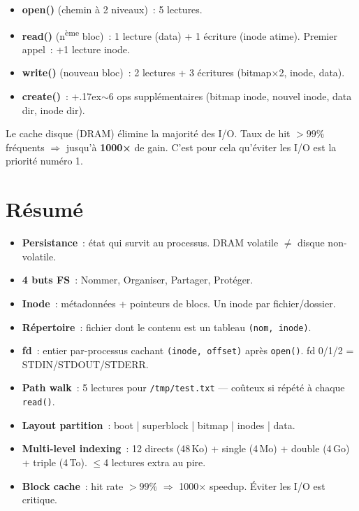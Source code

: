 \documentclass[11pt,a4paper,openany]{book}
\begin{document}
\begin{keybox}[title={Nombre d'opérations disque}]
\begin{itemize}
  \item \textbf{open()} (chemin à 2 niveaux)~: 5 lectures.
  \item \textbf{read()} (n\textsuperscript{ème} bloc)~: 1 lecture (data) + 1 écriture (inode atime). Premier appel~: +1 lecture inode.
  \item \textbf{write()} (nouveau bloc)~: 2 lectures + 3 écritures (bitmap×2, inode, data).
  \item \textbf{create()}~: +{\raise.17ex\hbox{$\scriptstyle\sim$}}6 ops supplémentaires (bitmap inode, nouvel inode, data dir, inode dir).
\end{itemize}
\end{keybox}

\begin{keybox}[title={Block Cache}]
Le cache disque (DRAM) élimine la majorité des I/O. Taux de hit $>99\%$ fréquents $\Rightarrow$ jusqu'à \textbf{1000×} de gain. C'est pour cela qu'éviter les I/O est la priorité numéro 1.
\end{keybox}

\clearpage
\section*{Résumé}

\begin{keybox}
\begin{itemize}
  \item \textbf{Persistance}~: état qui survit au processus. DRAM volatile $\neq$ disque non-volatile.
  \item \textbf{4 buts FS}~: Nommer, Organiser, Partager, Protéger.
  \item \textbf{Inode}~: métadonnées + pointeurs de blocs. Un inode par fichier/dossier.
  \item \textbf{Répertoire}~: fichier dont le contenu est un tableau \texttt{(nom, inode)}.
  \item \textbf{fd}~: entier par-processus cachant \texttt{(inode, offset)} après \texttt{open()}. fd 0/1/2 = STDIN/STDOUT/STDERR.
  \item \textbf{Path walk}~: 5 lectures pour \texttt{/tmp/test.txt} — coûteux si répété à chaque \texttt{read()}.
  \item \textbf{Layout partition}~: boot | superblock | bitmap | inodes | data.
  \item \textbf{Multi-level indexing}~: 12 directs (48\,Ko) + single (4\,Mo) + double (4\,Go) + triple (4\,To). $\le$4 lectures extra au pire.
  \item \textbf{Block cache}~: hit rate $>99\%$ $\Rightarrow$ 1000× speedup. Éviter les I/O est critique.
\end{itemize}
\end{keybox}
\end{document}
